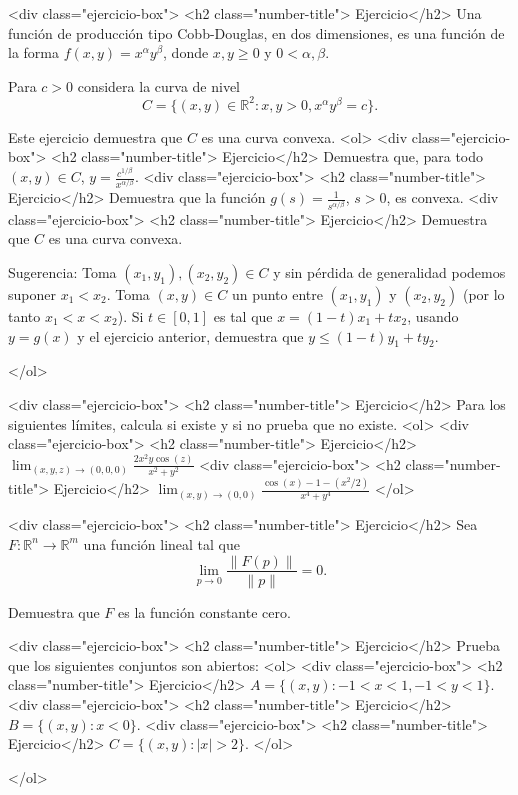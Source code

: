 \documentclass{article}
\theoremstyle{definition}
\begin{document}
	
	<div class="ejercicio-box"> <h2 class="number-title"> Ejercicio</h2> Una función de producción tipo Cobb-Douglas, en dos dimensiones, es una función
	de la forma $f(x,y)=x^\alpha y^\beta$, donde $x,y \geq 0$ y $0<\alpha, \beta$.
	
	Para $c>0$ considera la curva de nivel
	$$
	C=\{ (x,y)\in \mathbb{R}^2: x, y > 0, x^\alpha y^\beta =c\}.
	$$
	
	
	
	
	Este ejercicio demuestra que $C$ es una curva convexa. 
	<ol>
	<div class="ejercicio-box"> <h2 class="number-title"> Ejercicio</h2> Demuestra que, para todo $(x,y)\in C$, $y=\frac{c^{1/\beta}}{x^{\alpha/\beta}}$.
	<div class="ejercicio-box"> <h2 class="number-title"> Ejercicio</h2> Demuestra que la función $g(s)=\frac{1}{s^{\alpha / \beta}}$, $s >0$, es convexa. 
	<div class="ejercicio-box"> <h2 class="number-title"> Ejercicio</h2> Demuestra  que $C$ es una curva convexa.
	
	Sugerencia: Toma $(x_1,y_1), (x_2,y_2)\in C$ y sin pérdida de generalidad podemos suponer $x_1<x_2$. Toma
	$(x,y)\in C$ un punto entre $(x_1,y_1)$ y $(x_2,y_2)$ (por lo tanto $x_1<x<x_2$). Si $t\in [0,1]$
	es tal que $x=(1-t)x_1+tx_2$, usando $y=g(x)$ y el ejercicio anterior, demuestra que  $y\leq (1-t)y_1+ty_2$.
	
	</ol>



      <div class="ejercicio-box"> <h2 class="number-title"> Ejercicio</h2> Para los siguientes límites, calcula si existe y si no prueba que no existe.
        <ol>
        <div class="ejercicio-box"> <h2 class="number-title"> Ejercicio</h2> $\lim_{(x,y,z)\to (0,0,0)} \frac{2x^2y\cos(z)}{x^2+y^2}$
          <div class="ejercicio-box"> <h2 class="number-title"> Ejercicio</h2> $\lim_{(x,y)\to (0,0)} \frac{\cos(x)-1-(x^2/2)}{x^4+y^4}$
        </ol>
    
  <div class="ejercicio-box"> <h2 class="number-title"> Ejercicio</h2> Sea $F:\mathbb{R}^n \to \mathbb{R}^m$ una función lineal tal que
    $$
    \lim_{p\to 0} \frac{\|F(p)\|}{\|p\|}=0.
    $$

    Demuestra que $F$ es la función constante cero.

  <div class="ejercicio-box"> <h2 class="number-title"> Ejercicio</h2> Prueba que los siguientes conjuntos son abiertos:
    <ol>
    <div class="ejercicio-box"> <h2 class="number-title"> Ejercicio</h2> $A=\{(x,y): -1< x <1, -1<y <1  \}$.
  <div class="ejercicio-box"> <h2 class="number-title"> Ejercicio</h2> $B=\{(x,y): x< 0  \}$.
    <div class="ejercicio-box"> <h2 class="number-title"> Ejercicio</h2> $C=\{ (x,y): |x|>2  \}$.
    </ol>
    


  </ol>
  
  
       
\end{document}
